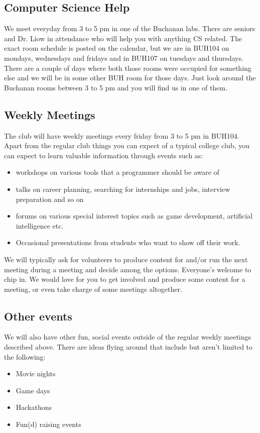 \subsection{Computer Science Help}
\label{sec-3-1}

We meet everyday from 3 to 5 pm in one of the Buchanan labs. There are seniors
and Dr. Liow in attendance who will help you with anything CS related. The
exact room schedule is posted on the calendar, but we are in BUH104 on mondays,
wednesdays and fridays and in BUH107 on tuesdays and thursdays. There are a
couple of days where both those rooms were occupied for something else and we
will be in some other BUH room for those days. Just look around the Buchanan
rooms between 3 to 5 pm and you will find us in one of them.

\subsection{Weekly Meetings}
\label{sec-3-2}

The club will have weekly meetings every friday from 3 to 5 pm in BUH104. Apart
from the regular club things you can expect of a typical college club, you can
expect to learn valuable information through events such as:
\begin{itemize}
\item workshops on various tools that a programmer should be aware of
\item talks on career planning, searching for internships and jobs, interview
preparation and so on
\item forums on various special interest topics such as game development,
artificial intelligence etc.
\item Occasional presentations from students who want to show off their work.
\end{itemize}

We will typically ask for volunteers to produce content for and/or run the next
meeting during a meeting and decide among the options. Everyone's welcome to
chip in. We would love for you to get involved and produce some content for a
meeting, or even take charge of some meetings altogether.

\subsection{Other events}
\label{sec-3-3}

We will also have other fun, social events outside of the regular weekly
meetings described above. There are ideas flying around that include but aren't
limited to the following:
\begin{itemize}
\item Movie nights
\item Game days
\item Hackathons
\item Fun(d) raising events
\end{itemize}


